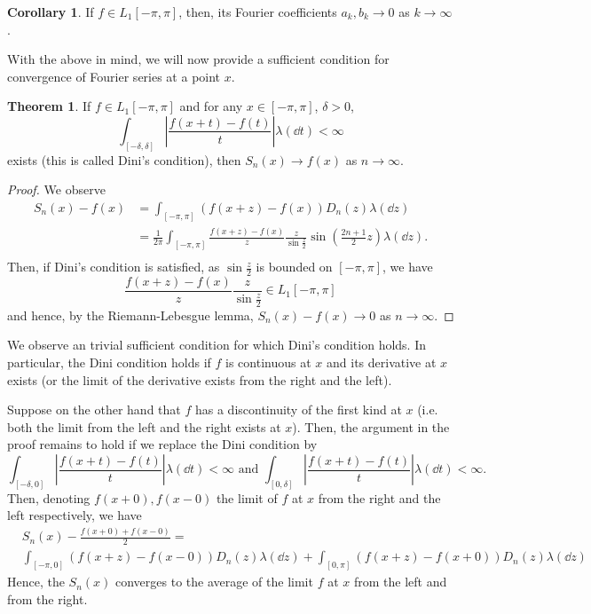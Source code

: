 \documentclass[]{article}
\theoremstyle{definition}
\newtheorem{theorem}{Theorem}
\newtheorem{corollary}{Corollary}[theorem]
\theoremstyle{definition}
\begin{document}
\begin{corollary}
  If \(f \in L_1[-\pi, \pi]\), then, its Fourier coefficients \(a_k, b_k \to 0\) 
  as \(k \to \infty\).
\end{corollary}

With the above in mind, we will now provide a sufficient condition for convergence of 
Fourier series at a point \(x\).

\begin{theorem}
  If \(f \in L_1[-\pi, \pi]\) and for any \(x \in [-\pi, \pi]\), \(\delta > 0\), 
  \[\int_{[-\delta, \delta]} \left|\frac{f(x + t) - f(t)}{t}\right| \lambda(\dd t) < \infty\]
  exists (this is called Dini's condition), then \(S_n(x) \to f(x)\) as \(n \to \infty\).
\end{theorem}
\begin{proof}
  We observe
  \[\begin{split}
    S_n(x) - f(x) & = \int_{[-\pi, \pi]} (f(x + z) - f(x)) D_n(z) \lambda(\dd z)\\
    & = \frac{1}{2\pi}\int_{[-\pi, \pi]} \frac{f(x + z) - f(x)}{z} 
      \frac{z}{\sin \frac{z}{2}} \sin \left(\frac{2 n + 1}{2}z\right)\lambda(\dd z).\\
  \end{split}\]
  Then, if Dini's condition is satisfied, as \(\sin \frac{z}{2}\) is bounded on 
  \([-\pi, \pi]\), we have 
  \[\frac{f(x + z) - f(x)}{z} \frac{z}{\sin \frac{z}{2}} \in L_1[-\pi, \pi]\]
  and hence, by the Riemann-Lebesgue lemma, \(S_n(x) - f(x) \to 0\) as 
  \(n \to \infty\).
\end{proof}

We observe an trivial sufficient condition for which Dini's condition holds. 
In particular, the Dini condition holds if \(f\) is continuous at \(x\) and its derivative at 
\(x\) exists (or the limit of the derivative exists from the right and the left).

Suppose on the other hand that \(f\) has a discontinuity of the first kind at 
\(x\) (i.e. both the limit from the left and the right exists at \(x\)). Then, 
the argument in the proof remains to hold if we replace the Dini condition by 
\[\int_{[-\delta, 0] } \left|\frac{f(x + t) - f(t)}{t}\right| \lambda(\dd t) < \infty
\text{ and } 
\int_{[0, \delta] } \left|\frac{f(x + t) - f(t)}{t}\right| \lambda(\dd t) < \infty.\]
Then, denoting \(f(x + 0), f(x - 0)\) the limit of \(f\) at \(x\) from the right and the 
left respectively, we have
\[\begin{split}
  &S_n(x) - \frac{f(x + 0) + f(x - 0)}{2} =\\ 
  &\int_{[-\pi, 0]} (f(x + z) - f(x - 0)) D_n(z) \lambda(\dd z)
 + \int_{[0, \pi]} (f(x + z) - f(x + 0)) D_n(z) \lambda(\dd z)
 \end{split}\]
Hence, the \(S_n(x)\) converges to the average of the limit \(f\) at \(x\) from 
the left and from the right.
\end{document}
